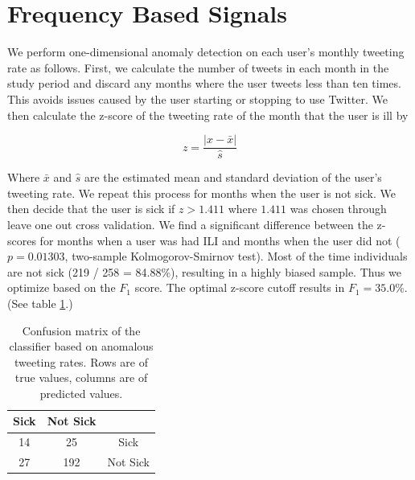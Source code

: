 \documentclass{acm_proc_article-sp}
\begin{document}
\section{Frequency Based Signals}

We perform one-dimensional anomaly detection on each user's monthly tweeting rate as follows. First, we calculate the number of tweets in each month in the study period and discard any months where the user tweets less than ten times. This avoids issues caused by the user starting or stopping to use Twitter. We then calculate the z-score of the tweeting rate of the month that the user is ill by

\begin{equation}
z = \frac{|x - \bar{x}|}{\hat{s}}
\end{equation}

Where \(\bar{x}\) and \(\hat{s}\) are the estimated mean and standard deviation of the user's tweeting rate. \cite{Grubs:1969ab} We repeat this process for months when the user is not sick. We then decide that the user is sick if \(z > 1.411\) where \(1.411\) was chosen through leave one out cross validation. We find a significant difference between the z-scores for months when a user was had ILI and months when the user did not (\(p = 0.01303\), two-sample Kolmogorov-Smirnov test). Most of the time individuals are not sick (219 / 258 = 84.88\%), resulting in a highly biased sample. Thus we optimize based on the \(F_1\) score. The optimal z-score cutoff results in \(F_1= 35.0\%\). (See table \ref{tab:tweet_anomaly_confusion}.) 


\begin{table}
\centering
\begin{tabular}{|c|c|c|} \hline
Sick&Not Sick&\ \\ \hline
14 & 25 & Sick\\ \hline
27 & 192 & Not Sick\\
\hline\end{tabular}
\caption{Confusion matrix of the classifier based on anomalous tweeting rates. Rows are of true values, columns are of predicted values.}
\label{tab:tweet_anomaly_confusion}
\end{table}
\end{document}
